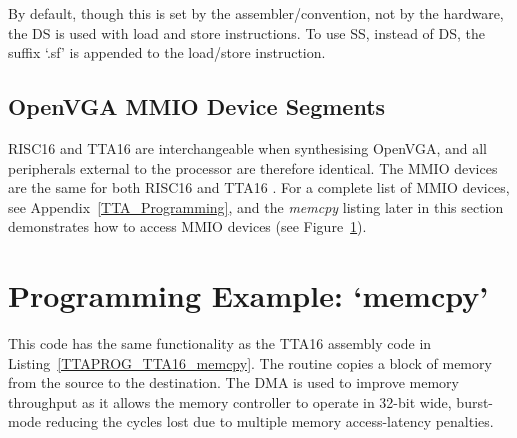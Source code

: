 By default, though this is set by the assembler/convention, not by the hardware,
the DS is used with load and store instructions. To use SS, instead of DS, the
suffix `.sf' is appended to the load/store instruction.


\subsection{OpenVGA MMIO Device Segments}
RISC16 and TTA16 are interchangeable when synthesising OpenVGA, and all
peripherals external to the processor are therefore identical. The MMIO devices
are the same for both RISC16 and TTA16 . For a complete list of MMIO devices, see
Appendix~\ref{TTA_Programming}, and the \textit{memcpy} listing later in this
section demonstrates how to access MMIO devices (see
Figure~\ref{RISCPROG_Memcpy}).


\section{Programming Example: `memcpy'}
\label{RISCPROG_Memcpy}
This code has the same functionality as the TTA16 assembly code in
Listing~\ref{TTAPROG_TTA16_memcpy}. The routine copies a block of memory from the
source to the destination. The DMA is used to improve memory throughput as it
allows the memory controller to operate in 32-bit wide, burst-mode reducing the
cycles lost due to multiple memory access-latency penalties.

\footnotesize

\normalsize
